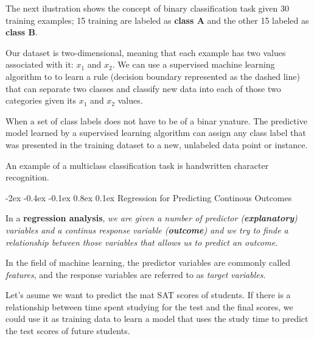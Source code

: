 \documentclass[12pt]{report}
\makeatletter
\renewcommand{\subsection}{\@startsection{subsection}{2}{\z@}%
  {-2ex \@plus -0.4ex \@minus -0.1ex}%
  {0.8ex \@plus 0.1ex}%
  {\normalfont\large\subsectionstyle}}
\newcommand{\subsectionstyle}[1]{%
  \par\noindent\hrule
  \vspace{-0.4ex}%
  {\scshape #1\par}%
  \vspace{0.4ex}%
  \hrule
}
\theoremstyle{largebreak}
\makeatother
\begin{document}
    The next ilustration shows the concept of binary classification task given 30 training examples; 15 training are labeled as \textbf{class A} and the other 15 labeled as \textbf{class B}.

    Our dataset is two-dimensional, meaning that each example has two values associated with it: $x_1$ and $x_2$. We can use a supervised machine learning algorithm to to learn a rule (decision boundary represented as the dashed line) that can separate two classes and classify new data into each of those two categories given its $x_1$ and $x_2$ values.

    \begin{obs}
        When a set of class labels does not have to be of a binar ynature. The predictive model learned by a supervised learning algorithm can assign any class label that was presented in the training dataset to a new, unlabeled data point or instance.
    \end{obs}

    \begin{exa}
        An example of a multiclass classification task is handwritten character recognition.
    \end{exa}

    \subsection{Regression for Predicting Continous Outcomes}

    \begin{mydef}
        In a \textbf{regression analysis}, \textit{we are given a number of predictor (\textbf{explanatory}) variables and a continus response variable (\textbf{outcome}) and we try to finde a relationship between those variables that allows us to predict an outcome}.
    \end{mydef}

    \begin{obs}
        In the field of machine learning, the predictor variables are commonly called \textit{features}, and the response variables are referred to as \textit{target variables}.
    \end{obs}

    \begin{exa}
        Let's asume we want to predict the mat SAT scores of students. If there is a relationship between time spent studying for the test and the final scores, we could use it as training data to learn a model that uses the study time to predict the test scores of future students.
    \end{exa}
\end{document}
